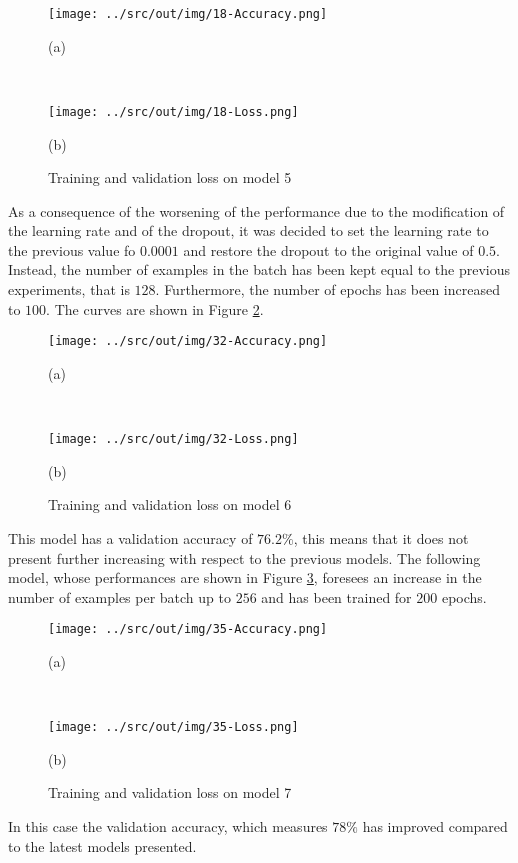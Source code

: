 \documentclass[a4paper,12pt]{article} %
\begin{document}
	\begin{figure}[htb]
		\begin{minipage}[c]{.49\textwidth}
			\centering
			\texttt{[image: ../src/out/img/18-Accuracy.png]}
			\caption*{(a)}
		\end{minipage}
		~
		\begin{minipage}[c]{.49\textwidth}
			\centering
			\texttt{[image: ../src/out/img/18-Loss.png]}
			\caption*{(b)}
		\end{minipage}
		\caption{Training and validation loss on model 5}
		\label{fig:model5-performance}
	\end{figure}
	
	As a consequence of the worsening of the performance due to the 
	modification of the learning rate and of the dropout, it was decided to set 
	the learning rate to the previous value fo $0.0001$ and restore the dropout 
	to the original value of $0.5$. Instead, the number of examples in the batch
	has been kept equal to the previous experiments, that is $128$. 
	Furthermore, the number of epochs has been increased to $100$.
	The curves are shown in Figure \ref{fig:model6-performance}.
		
	\begin{figure}[htb]
		\begin{minipage}[c]{.49\textwidth}
			\centering
			\texttt{[image: ../src/out/img/32-Accuracy.png]}
			\caption*{(a)}
		\end{minipage}
		~
		\begin{minipage}[c]{.49\textwidth}
			\centering
			\texttt{[image: ../src/out/img/32-Loss.png]}
			\caption*{(b)}
		\end{minipage}
		\caption{Training and validation loss on model 6}
		\label{fig:model6-performance}
	\end{figure}

	This model has a validation accuracy of $76.2\%$, this means that it does 
	not present further increasing with respect to the previous models.
	The following model, whose performances are shown in Figure 
	\ref{fig:model7-performance}, foresees an increase in the number of 
	examples per batch up to $256$ and has been trained for $200$ epochs.
	
	\begin{figure}[htb]
		\begin{minipage}[c]{.49\textwidth}
			\centering
			\texttt{[image: ../src/out/img/35-Accuracy.png]}
			\caption*{(a)}
		\end{minipage}
		~
		\begin{minipage}[c]{.49\textwidth}
			\centering
			\texttt{[image: ../src/out/img/35-Loss.png]}
			\caption*{(b)}
		\end{minipage}
		\caption{Training and validation loss on model 7}
		\label{fig:model7-performance}
	\end{figure}
	In this case the validation accuracy, which measures $78\%$ has improved 
	compared to the latest models presented.
		 
\end{document}
